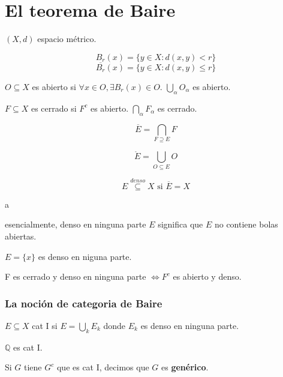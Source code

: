 \section{El teorema de Baire}

$(X,d)$ espacio métrico.

\[B_r(x)=\{y\in X:d(x,y)<r\}\]
\[\overline{B_r}(x)=\{y\in X:d(x,y)\leq r\}\]

$O\subseteq X$ es abierto si $\forall x\in O,\exists B_r(x)\in O$. $\bigcup_\alpha O_\alpha$ es abierto.

$F\subseteq X$ es cerrado si $F^c$ es abierto. $\bigcap_\alpha F_\alpha$ es cerrado.

\[\overline{E}=\bigcap_{F\supseteq E} F\]

\[\mathring{E}=\bigcup_{O\subseteq E}O\]

\[E\overset{denso}{\subseteq} X \text{ si }\overline{E}=X\]


\begin{fdefinition}
    a
\end{fdefinition}

esencialmente, denso en ninguna parte $E$ significa que $E$ no contiene bolas abiertas.

\begin{fexample}
    $E=\{x\}$ es denso en niguna parte.
\end{fexample}

\begin{fproposition}
    F es cerrado y denso en ninguna parte $\iff F^c$ es abierto y denso.
\end{fproposition}

\subsubsection*{La noción de categoria de Baire}

\begin{fdefinition}
    $E\subseteq X$ cat I si $E=\bigcup_{k}E_k$ donde $E_k$ es denso en ninguna parte.
\end{fdefinition}

\begin{fexample}
    $\mathbb{Q}$ es cat I.
\end{fexample}

\begin{fdefinition}
    Si $G$ tiene $G^c$ que es cat I, decimos que $G$ es \textbf{genérico}.
\end{fdefinition}

